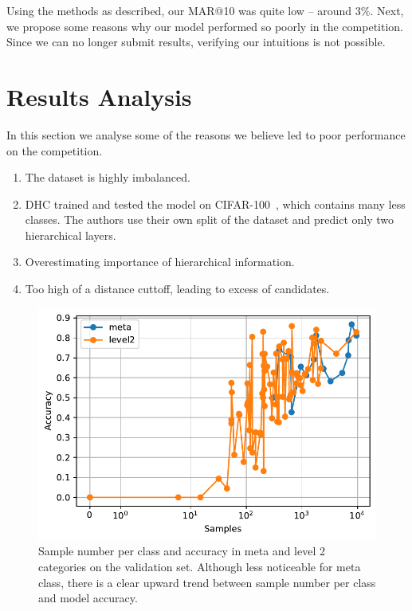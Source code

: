 \documentclass[conference]{IEEEtran}
\begin{document}
Using the methods as described, our MAR@10 was quite low -- around $3\%$.
Next, we propose some reasons why our model performed so poorly in the 
competition. 
Since we can no longer submit results, verifying our intuitions is 
not possible.

\section{Results Analysis}
In this section we analyse some of the reasons we believe led to poor performance on the 
competition.
\begin{enumerate}
		\item{The dataset is highly imbalanced.}
		\item{DHC trained and tested the model on CIFAR-100~\cite{krizhevsky2009learning}, which
				contains many less classes. The authors use their own split of the dataset and predict
				only two hierarchical layers.
		}
		\item{Overestimating importance of hierarchical information.}
		\item{Too high of a distance cuttoff, leading to excess of candidates.}
\end{enumerate}
\begin{figure}[!t]
		\centering
		\includegraphics[scale=0.6]{accs}
		\caption{Sample number per class and accuracy in meta and level 2 categories
			on the validation set.
			Although less noticeable for meta class, there is a clear upward trend
			between sample number per class and model accuracy.
		}
		\label{fig:accs}
\end{figure}
\end{document}
